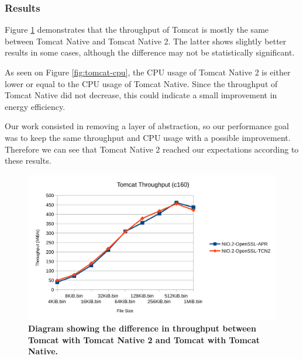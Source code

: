 \documentclass[11pt,a4paper,bibliography=totocnumbered]{scrartcl}
\def\mytitle{Tomcat Native 2}
\begin{document}
\subsubsection{Results}
Figure \ref{fig:tomcat-throughput} demonstrates that the throughput of Tomcat is mostly the same between Tomcat Native and \mytitle{}. The latter shows slightly better results in some cases, although the difference may not be statistically significant.

As seen on Figure \ref{fig:tomcat-cpu}, the CPU usage of \mytitle{} is either lower or equal to the CPU usage of Tomcat Native. Since the throughput of Tomcat Native did not decrease, this could indicate a small improvement in energy efficiency.

Our work consisted in removing a layer of abstraction, so our performance goal was to keep the same throughput and CPU usage with a possible improvement. Therefore we can see that \mytitle{} reached our expectations according to these results.
\begin{figure}[!h]
	\begin{center}
		\includegraphics[scale=0.23]{tomcat-throughput.pdf}
	\end{center}
	\caption{\textbf{Diagram showing the difference in throughput between Tomcat with \mytitle{} and Tomcat with Tomcat Native.}}
	\label{fig:tomcat-throughput}
\end{figure}
\end{document}
